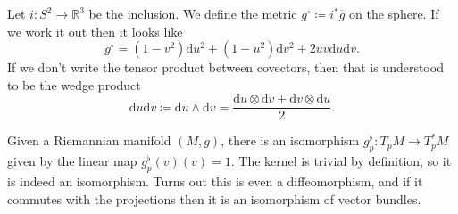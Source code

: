 
Let $i : S^2 \to \mathbb{R} ^3$ be the inclusion. We define the metric $g^\circ  \coloneqq i^* \overline{g} $ on the sphere. If we work it out then it looks like
\[
	g^\circ =\left( 1-v^2 \right) \mathrm{d} u^2 + \left( 1-u^2 \right) \mathrm{d} v^2 + 2uv\mathrm{d} u\mathrm{d} v
.\]
If we don't write the tensor product between covectors, then that is understood to be the wedge product
\[
	\mathrm{d} u\mathrm{d} v \coloneqq \mathrm{d} u \wedge \mathrm{d} v = \frac{\mathrm{d} u \otimes \mathrm{d} v + \mathrm{d} v \otimes \mathrm{d} u}{2} 
.\]

Given a Riemannian manifold $(M,g)$, there is an isomorphism $g^\flat_p : T_pM \to T_p^*M$ given by the linear map $g_p^\flat(v)(v) = 1$. The kernel is trivial by definition, so it is indeed an isomorphism. Turns out this is even a diffeomorphism, and if it commutes with the projections then it is an isomorphism of vector bundles.
